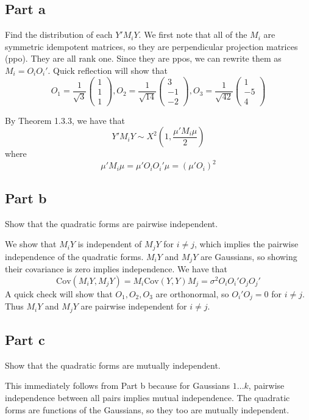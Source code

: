 \documentclass{article}
\newcommand{\cov}{\text{Cov}}
\begin{document}
\subsection*{Part a}
Find the distribution of each $Y'M_iY$.
We first note that all of the $M_i$ are symmetric idempotent matrices, so they are perpendicular projection matrices (ppo). They are all rank one. Since they are ppos, we can rewrite them as $M_i = O_iO_i'$. Quick reflection will show that
\[
O_1 = \frac{1}{\sqrt{3}}\begin{pmatrix} 1\\ 1\\ 1\end{pmatrix},
O_2 = \frac{1}{\sqrt{14}}\begin{pmatrix} 3\\ -1\\ -2\end{pmatrix},
O_3 = \frac{1}{\sqrt{42}}\begin{pmatrix} 1\\ -5\\ 4\end{pmatrix}
\]

By Theorem 1.3.3, we have that
\[
Y'M_iY \sim X^2(1, \frac{\mu'M_i\mu}{2})
\]
where
\[
\mu'M_i\mu = \mu' O_iO_i' \mu = (\mu'O_i)^2
\]

\subsection*{Part b}
Show that the quadratic forms are pairwise independent.

We show that $M_iY$ is independent of $M_jY$ for $i \neq j$, which implies the pairwise independence of the quadratic forms. $M_iY$ and $M_jY$ are Gaussians, so showing their covariance is zero implies independence. We have that
\[
\cov(M_iY, M_jY) = M_i\cov(Y, Y)M_j = \sigma^2O_iO_i'O_jO_j'
\]
A quick check will show that $O_1, O_2, O_3$ are orthonormal, so $O_i'O_j = 0$ for $i\neq j$. Thus $M_iY$ and $M_jY$ are pairwise independent for $i \neq j$.
\subsection*{Part c}
Show that the quadratic forms are mutually independent.

This immediately follows from Part b because for Gaussians $1 ... k$, pairwise independence between all pairs implies mutual independence. The quadratic forms are functions of the Gaussians, so they too are mutually independent.
\end{document}
